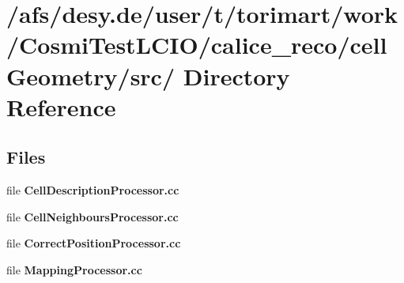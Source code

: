 \section{/afs/desy.de/user/t/torimart/work/CosmiTestLCIO/calice\_\-reco/cellGeometry/src/ Directory Reference}
\label{dir_4d2ebd460221b9363b3ccd60d79cc666}
\subsection*{Files}
\begin{DoxyCompactItemize}
\item 
file {\bfseries CellDescriptionProcessor.cc}
\item 
file {\bfseries CellNeighboursProcessor.cc}
\item 
file {\bfseries CorrectPositionProcessor.cc}
\item 
file {\bfseries MappingProcessor.cc}
\end{DoxyCompactItemize}
